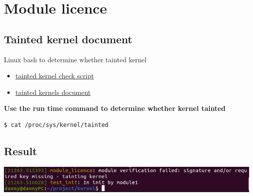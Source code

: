 \section{Module licence}

\subsection{Tainted kernel document}
Linux bash to determine whether tainted kernel
\begin{itemize}
    \item \href{https://git.kernel.org/pub/scm/linux/kernel/git/torvalds/linux.git/plain/tools/debugging/kernel-chktaint}{tainted kernel check script}
    \item \href{https://www.kernel.org/doc/html/latest/admin-guide/tainted-kernels.html}{tainted kernels document}
\end{itemize}

\textbf{Use the run time command to determine whether kernel tainted}
\begin{lstlisting}[style=CStyle]
    $ cat /proc/sys/kernel/tainted
\end{lstlisting}


\subsection{Result}
\begin{center}
    \includegraphics[width=\linewidth]{images/module_licence_out.png}
\end{center}
